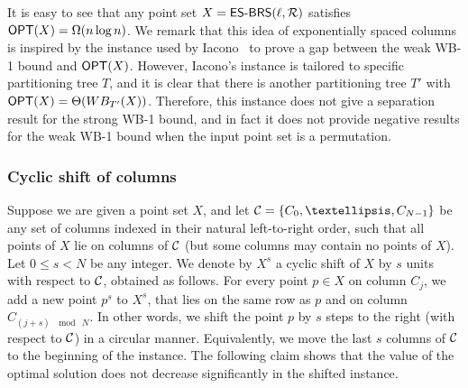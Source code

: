 \documentclass[11pt]{article}
\numberwithin{equation}{section}
\theoremstyle{definition}
\theoremstyle{plain}
\begin{document}
It is easy to see that any point set $X= \mbox{\sf{ES-BRS}}(\ell, {\mathcal R})$ satisfies $\mbox{\sf OPT}(X) = \Omega(n \log n)$.  
We remark that this idea of exponentially spaced columns is inspired by the instance used by Iacono~\cite{in_pursuit} to prove a gap between the weak WB-1 bound and $\mbox{\sf OPT}(X)$.  
However, Iacono's instance is tailored to specific partitioning tree $T$, and it is clear that there is another partitioning tree $T'$ with $\mbox{\sf OPT}(X) = \Theta(WB_{T'}(X))$.
Therefore, this instance does not give a separation result for the strong WB-1 bound, and in fact it does not provide negative results for the weak WB-1 bound when the input point set is a permutation.    



\subsubsection{Cyclic shift of columns}


Suppose we are given a point set $X$, and let $\cset=\set{C_0,\ldots,C_{N-1}}$ be any set of columns indexed in their natural left-to-right order, such that all points of $X$ lie on columns of ${\mathcal C}$ (but some columns may contain no points of $X$).
Let $0\leq s<N$ be any integer. We denote by $X^s$ a cyclic shift of $X$ by $s$ units with respect to ${\mathcal C}$, obtained as follows. 
For every point $p\in X$ on column $C_j$, we add a new point $p^s$ to $X^s$, that lies on the same row as $p$ and on column $C_{(j+s)~\mod~N}$.  
In other words, we shift the point $p$ by $s$ steps to the right (with respect to ${\mathcal C}$) in a circular manner. Equivalently, we move the last $s$ columns of ${\mathcal C}$ to the beginning of the instance.
The following claim shows that the value of the optimal solution does not decrease significantly in the shifted instance.
\end{document}
